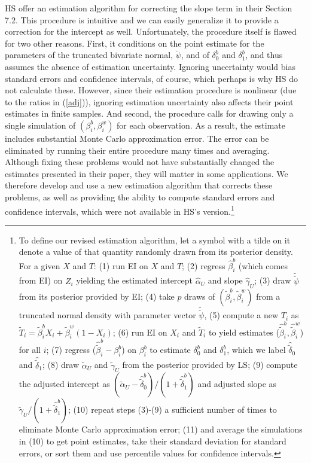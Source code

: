 \documentclass[11pt,titlepage]{article}
\newcommand{\psiu}{\breve{\psi}}
\begin{document}
HS offer an estimation algorithm for correcting the slope term in
their Section 7.2.  This procedure is intuitive and we can easily
generalize it to provide a correction for the intercept as well.
Unfortunately, the procedure itself is flawed for two other reasons.
First, it conditions on the point estimate for the parameters of the
truncated bivariate normal, $\breve\psi$, and of $\delta_0^b$ and
$\delta_1^b$, and thus assumes the absence of estimation uncertainty.
Ignoring uncertainty would bias standard errors and confidence
intervals, of course, which perhaps is why HS do not calculate these.
However, since their estimation procedure is nonlinear (due to the
ratios in (\ref{adj})), ignoring estimation uncertainty also affects
their point estimates in finite samples.  And second, the procedure
calls for drawing only a single simulation of $(\beta_i^b,\beta_i^w)$
for each observation.  As a result, the estimate includes substantial
Monte Carlo approximation error.  The error can be eliminated by
running their entire procedure many times and averaging.  Although
fixing these problems would not have substantially changed the
estimates presented in their paper, they will matter in some
applications.  We therefore develop and use a new estimation algorithm
that corrects these problems, as well as providing the ability to
compute standard errors and confidence intervals, which were not
available in HS's version.\footnote{To define our revised estimation
  algorithm, let a symbol with a tilde on it denote a value of that
  quantity randomly drawn from its posterior density.  For a given $X$
  and $T$: (1) run EI on $X$ and $T$; (2) regress $\hat\beta_i^b$
  (which comes from EI) on $Z_i$ yielding the estimated intercept
  $\hat\alpha_U$ and slope $\hat\gamma_U$; (3) draw $\tilde\psiu$ from
  its posterior provided by EI; (4) take $p$ draws of
  $(\tilde\beta_i^b,\tilde\beta_i^w)$ from a truncated normal density
  with parameter vector $\tilde\psiu$, (5) compute a new $T_i$ as
  $\tilde T_i=\tilde\beta_i^bX_i+\tilde\beta_i^w(1-X_i)$; (6) run EI
  on $X_i$ and $\tilde T_i$ to yield estimates
  ($\hat{\tilde\beta}_i^b,\hat{\tilde\beta}_i^w$) for all $i$; (7)
  regress ($\hat{\tilde\beta}_i^b-\beta_i^b$) on $\beta_i^b$ to
  estimate $\delta_0^b$ and $\delta_1^b$, which we label
  $\hat{\tilde\delta}_0$ and $\hat{\tilde\delta}_1$; (8) draw
  $\tilde\alpha_U$ and $\tilde\gamma_U$ from the posterior provided by
  LS; (9) compute the adjusted intercept as
  $(\tilde\alpha_U-\hat{\tilde\delta}_0^b)/(1+\hat{\tilde\delta}_1^b)$
  and adjusted slope as $\tilde\gamma_U/(1+\hat{\tilde\delta}_1^b)$;
  (10) repeat steps (3)-(9) a sufficient number of times to eliminate
  Monte Carlo approximation error; (11) and average the simulations in
  (10) to get point estimates, take their standard deviation for
  standard errors, or sort them and use percentile values for
  confidence intervals.}
\end{document}
